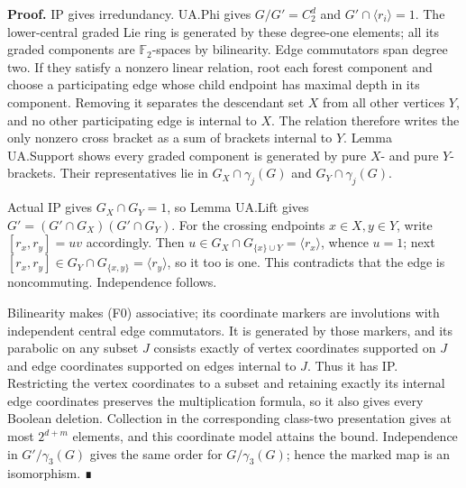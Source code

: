 \textbf{Proof.} IP gives irredundancy. UA.Phi gives \(G/G'=C_2^d\) and
\(G'\cap\langle r_i\rangle=1\). The lower-central graded Lie ring is
generated by these degree-one elements; all its graded components are
\(\mathbb F_2\)-spaces by bilinearity. Edge commutators span degree two.
If they satisfy a nonzero linear relation, root each forest component
and choose a participating edge whose child endpoint has maximal depth
in its component. Removing it separates the descendant set \(X\) from
all other vertices \(Y\), and no other participating edge is internal to
\(X\). The relation therefore writes the only nonzero cross bracket as a
sum of brackets internal to \(Y\). Lemma UA.Support shows every graded
component is generated by pure \(X\)- and pure \(Y\)-brackets. Their
representatives lie in \(G_X\cap\gamma_j(G)\) and
\(G_Y\cap\gamma_j(G)\).

Actual IP gives \(G_X\cap G_Y=1\), so Lemma UA.Lift gives
\(G'=(G'\cap G_X)(G'\cap G_Y)\). For the crossing endpoints
\(x\in X,y\in Y\), write \([r_x,r_y]=uv\) accordingly. Then
\(u\in G_X\cap G_{\{x\}\cup Y}=\langle r_x\rangle\), whence \(u=1\);
next \([r_x,r_y]\in G_Y\cap G_{\{x,y\}}=\langle r_y\rangle\), so it too
is one. This contradicts that the edge is noncommuting. Independence
follows.

Bilinearity makes (F0) associative; its coordinate markers are
involutions with independent central edge commutators. It is generated
by those markers, and its parabolic on any subset \(J\) consists exactly
of vertex coordinates supported on \(J\) and edge coordinates supported
on edges internal to \(J\). Thus it has IP. Restricting the vertex
coordinates to a subset and retaining exactly its internal edge
coordinates preserves the multiplication formula, so it also gives every
Boolean deletion. Collection in the corresponding class-two presentation
gives at most \(2^{d+m}\) elements, and this coordinate model attains
the bound. Independence in \(G'/\gamma_3(G)\) gives the same order for
\(G/\gamma_3(G)\); hence the marked map is an isomorphism. ∎
